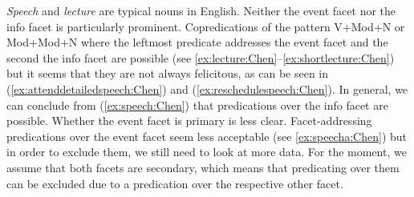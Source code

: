 \documentclass[output=paper,colorlinks,citecolor=brown,chinesefont]{langscibook}
\begin{document}
\emph{Speech} and \emph{lecture} are typical \dott{} nouns in English. Neither the event facet nor the info facet is particularly prominent.
 Copredications of the pattern V+Mod+N or Mod+Mod+N where the leftmost predicate addresses the event facet and the second the info facet are possible (see \ref{ex:lecture:Chen}--\ref{ex:shortlecture:Chen}) but it seems that they are not always felicitous, as can be seen in (\ref{ex:attenddetailedspeech:Chen}) and (\ref{ex:reschedulespeech:Chen}). In general, we can conclude from (\ref{ex:speech:Chen}) that  predications over the info facet are possible. Whether the event facet is primary is less clear. Facet-addressing predications over the event facet seem less acceptable (see 
 \ref{ex:speecha:Chen}) but in order to exclude them, we still need to look at more data. For the moment, we assume that both facets are secondary, which means that predicating over them can be excluded due to a predication over the respective other facet. %
\end{document}
